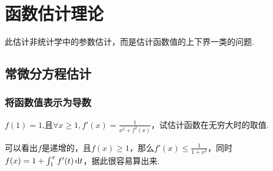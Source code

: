 \chapter{函数估计理论}
此估计非统计学中的参数估计，而是估计函数值的上下界一类的问题.

\section{常微分方程估计}
\subsection{将函数值表示为导数}
\begin{example}
	$f(1)=1$,且$\forall x\geq 1, f'(x)=\frac{1}{x^2+f^2(x)}$，试估计函数在无穷大时的取值.
\end{example}

\begin{solution}
	可以看出$f$是递增的，且$f(x)\geq 1$，那么$f'(x)\leq \frac{1}{1+x^2}$，同时$f(x)=1+\int_{1}^{x}f'(t)\mathop{}\!\mathrm{d} t$，据此很容易算出来.
\end{solution}
